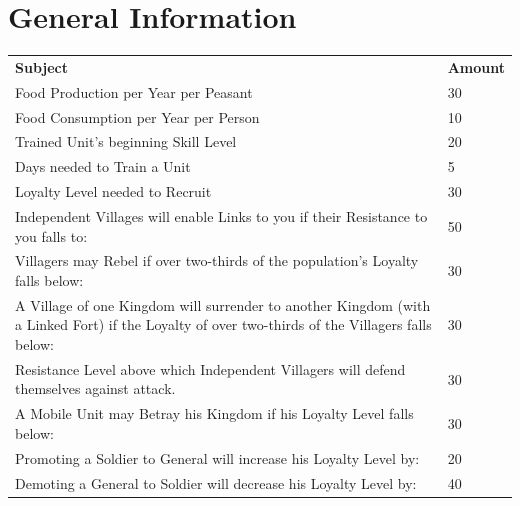 \section{General Information}

\begin{tabular}{|p{2in} p{2in}|}
    \hline
    \textbf{Subject} & \textbf{Amount} \\ 
    \rowcolor{gray}Food Production per Year per Peasant & 30 \\ 
    Food Consumption per Year per Person & 10 \\ 
    \rowcolor{gray}Trained Unit’s beginning Skill Level & 20 \\ 
    Days needed to Train a Unit    & 5 \\ 
    \rowcolor{gray}Loyalty Level needed to Recruit & 30 \\ 
    Independent Villages will enable Links to you if their Resistance to you falls to: & 50 \\ 
    \rowcolor{gray}Villagers may Rebel if over two-thirds of the population’s Loyalty falls below: & 30 \\ 
    A Village of one Kingdom will surrender to another Kingdom (with a Linked Fort) if the Loyalty of over two-thirds of the Villagers falls below: & 30 \\ 
    \rowcolor{gray}Resistance Level above which Independent Villagers will defend themselves against attack. & 30 \\ 
    A Mobile Unit may Betray his Kingdom if his Loyalty Level falls below: & 30 \\ 
    \rowcolor{gray}Promoting a Soldier to General will increase his Loyalty Level by: & 20 \\ 
    Demoting a General to Soldier will decrease his Loyalty Level by: & 40 \\ 
    \hline
\end{tabular}